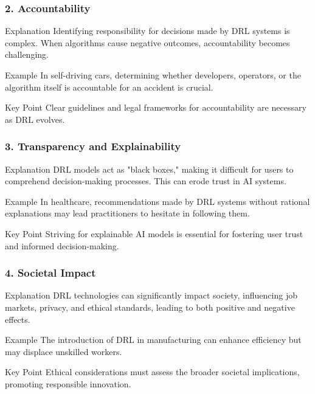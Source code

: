 \documentclass[aspectratio=169]{beamer}
\begin{document}
\begin{frame}[fragile]
    \frametitle{2. Accountability}
    \begin{block}{Explanation}
        Identifying responsibility for decisions made by DRL systems is complex. When algorithms cause negative outcomes, accountability becomes challenging.
    \end{block}
    \begin{block}{Example}
        In self-driving cars, determining whether developers, operators, or the algorithm itself is accountable for an accident is crucial.
    \end{block}
    \begin{block}{Key Point}
        Clear guidelines and legal frameworks for accountability are necessary as DRL evolves.
    \end{block}
\end{frame}

\begin{frame}[fragile]
    \frametitle{3. Transparency and Explainability}
    \begin{block}{Explanation}
        DRL models act as "black boxes," making it difficult for users to comprehend decision-making processes. This can erode trust in AI systems.
    \end{block}
    \begin{block}{Example}
        In healthcare, recommendations made by DRL systems without rational explanations may lead practitioners to hesitate in following them.
    \end{block}
    \begin{block}{Key Point}
        Striving for explainable AI models is essential for fostering user trust and informed decision-making.
    \end{block}
\end{frame}

\begin{frame}[fragile]
    \frametitle{4. Societal Impact}
    \begin{block}{Explanation}
        DRL technologies can significantly impact society, influencing job markets, privacy, and ethical standards, leading to both positive and negative effects.
    \end{block}
    \begin{block}{Example}
        The introduction of DRL in manufacturing can enhance efficiency but may displace unskilled workers.
    \end{block}
    \begin{block}{Key Point}
        Ethical considerations must assess the broader societal implications, promoting responsible innovation.
    \end{block}
\end{frame}
\end{document}
